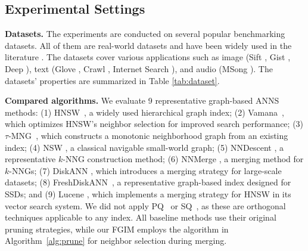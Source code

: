 \documentclass[acmsmall]{acmart}
\theoremstyle{remark}
\theoremstyle{definition}
\begin{document}
\subsection{Experimental Settings} 
\label{subsec:settings}

\noindent\textbf{Datasets.} The experiments are conducted on several popular benchmarking datasets. All of them are real-world datasets and have been widely used in the literature \cite{wang2021comprehensive,aumuller2020ann}. The datasets cover various applications such as image (Sift \cite{jegou2010product}, Gist \cite{jegou2010product}, Deep \cite{babenko2016efficient}), text (Glove \cite{pennington2014glove}, Crawl \cite{commoncrawl}, Internet Search \cite{Alipay2025}), and audio (MSong \cite{bertin2011million}). The datasets' properties are summarized in Table \ref{tab:dataset}.

\noindent\textbf{Compared algorithms.} We evaluate 9 representative graph-based ANNS methods: (1) HNSW~\cite{malkov2018efficient}, a widely used hierarchical graph index; (2) Vamana~\cite{jayaram2019diskann}, which optimizes HNSW’s neighbor selection for improved search performance; (3) $\tau$-MNG~\cite{peng2023efficient}, which constructs a monotonic neighborhood graph from an existing index; (4) NSW \cite{malkov2014approximate}, a classical navigable small-world graph; (5) NNDescent \cite{dong2011efficient}, a representative $k$-NNG construction method; (6) NNMerge \cite{zhao2021merge}, a merging method for $k$-NNGs; (7) DiskANN \cite{jayaram2019diskann}, which introduces a merging strategy for large-scale datasets; (8) FreshDiskANN~\cite{singh2021freshdiskann}, a representative graph-based index designed for SSDs; and (9) Lucene \cite{xian2024vector}, which implements a merging strategy for HNSW in its vector search system.
We did not apply PQ~\cite{jegou2010product} or SQ~\cite{aguerrebere2023similarity}, as these are orthogonal techniques applicable to any index. All baseline methods use their original pruning strategies, while our FGIM employs the algorithm in Algorithm~\ref{alg:prune} for neighbor selection during merging.
\end{document}
